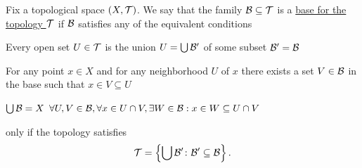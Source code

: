 \begin{definition}\label{def:topological_base}\cite[23]{Lectures:general_topology}
  Fix a topological space $(X, \mathcal T)$. We say that the family $\mathcal B \subseteq \mathcal T$ is a \uline{base for the topology $\mathcal T$} if $\mathcal B$ satisfies any of the equivalent conditions
  \begin{defenum}
    \item\label{def:topological_base/union} Every open set $U \in \mathcal T$ is the union $U = \bigcup \mathcal B'$ of some subset $\mathcal B' = \mathcal B$
    \item\label{def:topological_base/subset} For any point $x \in X$ and for any neighborhood $U$ of $x$ there exists a set $V \in \mathcal B$ in the base such that $x \in V \subseteq U$
    \item\label{def:topological_base/axioms}
    \begin{description}
       $\bigcup \mathcal B = X$
       $\forall U, V \in \mathcal B, \forall x \in U \cap V, \exists W \in \mathcal B: x \in W \subseteq U \cap V$
    \end{description}
    only if the topology satisfies
    \begin{equation}\label{def:topological_base/topology}
      \mathcal T = \left\{ \bigcup \mathcal B' \colon \mathcal B' \subseteq \mathcal B \right\}.
    \end{equation}
  \end{defenum}
\end{definition}
